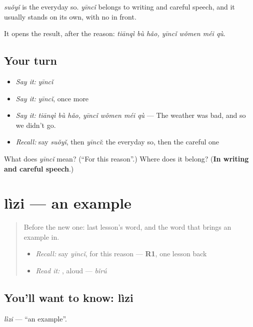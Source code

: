 \begin{grammarlens}[title={What you've built}]
\emph{suǒyǐ} is the everyday so. \emph{yīncǐ} belongs to writing and careful speech, and it usually stands on its own, with no  in front.

It opens the result, after the reason: \emph{tiānqì bù hǎo, yīncǐ wǒmen méi qù}.
\end{grammarlens}

\subsection*{Your turn}
\begin{itemize}
\raggedright
  \item \emph{Say it:} \emph{yīncǐ}
  \item \emph{Say it:} \emph{yīncǐ}, once more
  \item \emph{Say it:} \emph{tiānqì bù hǎo, yīncǐ wǒmen méi qù} — The weather was bad, and so we didn't go.
  \item \emph{Recall:} say \emph{suǒyǐ}, then \emph{yīncǐ}: the everyday so, then the careful one
\end{itemize}

\begin{tcolorbox}[breakable,colback=teal!4,colframe=teal!35!black,title={Before you move on}]
What does \emph{yīncǐ} mean? (\textquotedblleft{}For this reason\textquotedblright{}.) Where does it belong? (\textbf{In writing and careful speech}.)
\end{tcolorbox}
\section[lìzi]{lìzi — an example}

\label{lesson:ZH-C281-lizi}



\begin{quote}
Before the new one: last lesson's word, and the word that brings an example in.

\begin{itemize}
\raggedright
  \item \emph{Recall:} say \emph{yīncǐ}, for this reason — \textbf{R1}, one lesson back
  \item \emph{Read it:} , aloud — \emph{bǐrú}
\end{itemize}
\end{quote}

\subsection*{You'll want to know: lìzi}
\emph{lìzi} — \textquotedblleft{}an example\textquotedblright{}.


